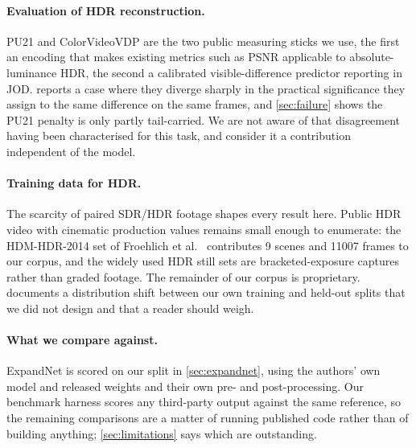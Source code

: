 \paragraph{Evaluation of HDR reconstruction.}
PU21 \citep{pu21} and ColorVideoVDP \citep{cvvdp} are the two public measuring
sticks we use, the first an encoding that makes existing metrics such as PSNR
applicable to absolute-luminance HDR, the second a calibrated visible-difference
predictor reporting in JOD.  reports a case where they diverge sharply in the practical
significance they assign to the same difference on the same frames, and
\cref{sec:failure} shows the PU21 penalty is only partly tail-carried. We are
not aware of that disagreement having been characterised for this task, and
consider it a contribution independent of the model.

\paragraph{Training data for HDR.}
The scarcity of paired SDR/HDR footage shapes every result here. Public HDR
video with cinematic production values remains small enough to enumerate: the
HDM-HDR-2014 set of Froehlich et al.~\citep{froehlich2014} contributes 9 scenes
and \num{11007} frames to our corpus, and the widely used HDR still sets
\citep{kalantari2017} are bracketed-exposure captures rather than graded footage.
The remainder of our corpus is proprietary.  documents a
distribution shift between our own training and held-out splits that we did not
design and that a reader should weigh.

\paragraph{What we compare against.}
ExpandNet \citep{marnerides2018} is scored on our split in \cref{sec:expandnet},
using the authors' own model and released weights and their own pre- and
post-processing. Our benchmark harness scores any third-party output against the
same reference, so the remaining comparisons are a matter of running published
code rather than of building anything; \cref{sec:limitations} says which are
outstanding.
